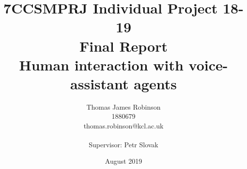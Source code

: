 \documentclass[a4paper,11pt]{report}
\begin{document}
\title{%
	7CCSMPRJ Individual Project 18-19\\
	Final Report \\
	\vspace{1mm}
	\LARGE Human interaction with voice-assistant agents}

\author{%
	\LARGE Thomas James Robinson\\
	1880679\\
	thomas.robinson@kcl.ac.uk\\
	\vspace{5mm}\\
	Supervisor: Petr Slovak
	}

\date{August 2019}

\maketitle

\tableofcontents
\newpage
{}
\end{document}
